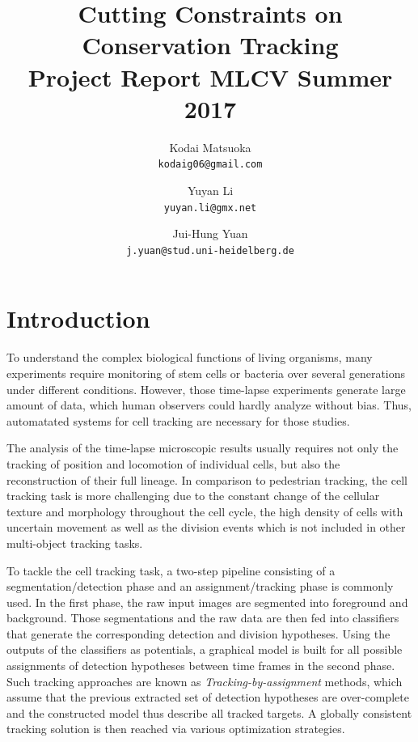 \documentclass[10pt,twocolumn,letterpaper]{article}
\begin{document}
\title{Cutting Constraints on Conservation Tracking\\
  \large{Project Report MLCV Summer 2017}
}

\author{Kodai Matsuoka\\
{\tt\small kodaig06@gmail.com}
\and
Yuyan Li\\
{\tt\small yuyan.li@gmx.net}
\and
Jui-Hung Yuan\\
{\tt\small j.yuan@stud.uni-heidelberg.de}
}

\maketitle

\begin{abstract}
\end{abstract}

\section{Introduction}

To understand the complex biological functions of living organisms, many experiments require monitoring of stem cells or bacteria over several generations under different conditions. However, those time-lapse experiments generate large amount of data, which human observers could hardly analyze without bias. Thus, automatated systems for cell tracking are necessary for those studies.

The analysis of the time-lapse microscopic results usually requires not only the tracking of position and locomotion of individual cells, but also the reconstruction of their full lineage. In comparison to pedestrian tracking, the cell tracking task is more challenging due to the constant change of the cellular texture and morphology throughout the cell cycle, the high density of cells with uncertain movement as well as the division events which is not included in other multi-object tracking tasks.

To tackle the cell tracking task, a two-step pipeline consisting of a segmentation/detection phase and an assignment/tracking phase is commonly used. In the first phase, the raw input images are segmented into foreground and background. Those segmentations and the raw data are then fed into classifiers that generate the corresponding detection and division hypotheses. Using the outputs of the classifiers as potentials, a graphical model is built for all possible assignments of  detection hypotheses between time frames in the second phase. Such tracking approaches are known as \textit{Tracking-by-assignment} methods, which assume that the previous extracted set of detection hypotheses are over-complete and the constructed model thus describe all tracked targets. A globally consistent tracking solution is then reached via various optimization strategies.
\end{document}
